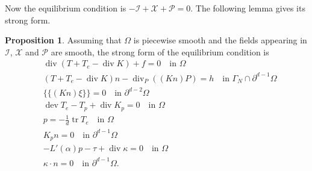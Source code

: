 \documentclass[a4paper,10pt,twoside]{amsbook}
\numberwithin{section}{chapter}
\numberwithin{equation}{chapter}
\theoremstyle{definition}
\newtheorem{prop}{Proposition}[chapter]
\DeclareMathOperator{\dev}{dev}
\DeclareMathOperator{\diver}{div}
\DeclareMathOperator{\tr}{tr}
\begin{document}
Now the equilibrium condition is $-\mathcal{I}+\mathcal{X}+\mathcal{P}=0$. The following lemma gives its strong form.
\begin{prop}
\label{prop:strong-form-pressure-sensitive-small}
Assuming that $\Omega$ is piecewise smooth and the fields appearing in $\mathcal{I}$, $\mathcal{X}$ and $\mathcal{P}$ are smooth, the strong form of the equilibrium condition is
\begin{align*}
&\diver(T+T_e-\diver K)+f=0\quad\text{in $\Omega$} \\
&(T+T_e-\diver K)n-\diver_P((Kn)P)=h\quad\text{in $\Gamma_N\cap\partial^{d-1}\Omega$} \\
&\{\!\!\{(Kn)\xi\}\!\!\}=0\quad\text{in $\partial^{d-2}\Omega$} \\
&\dev T_e-T_p+\diver K_p=0\quad\text{in $\Omega$} \\
&p=-\frac{1}{d}\tr T_e\quad\text{in $\Omega$} \\
&K_p n=0\quad\text{in $\partial^{d-1}\Omega$} \\
&-L'(\alpha)p-\tau+\diver\kappa=0\quad\text{in $\Omega$} \\
&\kappa\cdot n=0\quad\text{in $\partial^{d-1}\Omega$}.
\end{align*}
\end{prop}
\end{document}
